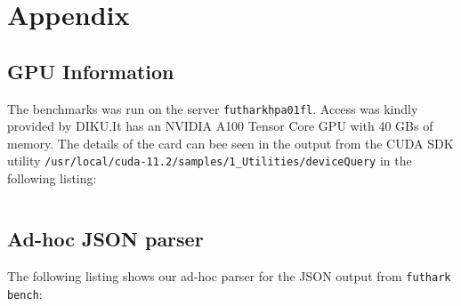 \appendix
\section{Appendix}

\subsection{GPU Information}\label{gpuinfo}
The benchmarks was run on the server \texttt{futharkhpa01fl}.  Access was kindly
provided by DIKU.\@  It has an NVIDIA A100 Tensor Core GPU with 40 GBs of memory.
The details of the card can bee seen in the output from the CUDA SDK utility
\texttt{/usr/local/cuda-11.2/samples/1_Utilities/deviceQuery} in the following
listing:

\inputminted[firstline=5,lastline=43]{text}{sections/a100.txt}


\subsection{Ad-hoc JSON parser}\label{jsonparser}
The following listing shows our ad-hoc parser for the JSON output from
\texttt{futhark bench}:

%



